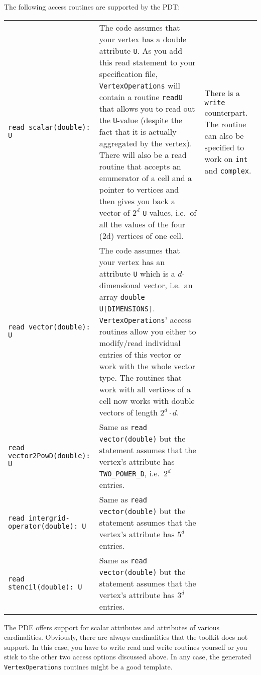 \noindent
The following access routines are supported by the PDT:

\begin{center}
\begin{tabular}{p{4.6cm}p{7.2cm}p{1.8cm}}
 \texttt{read scalar(double): U}
   & 
   The code assumes that your vertex has a double attribute \texttt{U}. As you
   add this read statement to your specification file, \texttt{VertexOperations}
   will contain a routine \texttt{readU} that allows you to read out the
   \texttt{U}-value (despite the fact that it is actually aggregated by the
   vertex).
   There will also be a read routine that accepts an enumerator of a cell and a
   pointer to vertices and then gives you back a vector of $2^d$
   \texttt{U}-values, i.e.~of all the values of the four (2d) vertices of one
   cell.
   &
   There is a \texttt{write} counterpart.
   The routine can also be specified to work on \texttt{int} and
   \texttt{complex}. \\
 \texttt{read vector(double): U}
   & 
   The code assumes that your vertex has an attribute \texttt{U} which is a
   $d$-dimensional vector, i.e.~an array \texttt{double U[DIMENSIONS]}.
   \texttt{VertexOperations}' access routines allow you either to modify/read
   individual entries of this vector or work with the whole vector type. The
   routines that work with all vertices of a cell now works with double vectors
   of length $2^d \cdot d$.
   \\
 \texttt{read vector2PowD(double): U}
   & 
   Same as \texttt{read vector(double)} but the statement assumes that the
   vertex's attribute has \texttt{TWO\_POWER\_D}, i.e.~$2^d$ entries.
   \\
 \texttt{read intergrid-operator(double): U}
   & 
   Same as \texttt{read vector(double)} but the statement assumes that the
   vertex's attribute has $5^d$ entries.
   \\
 \texttt{read stencil(double): U}
   & 
   Same as \texttt{read vector(double)} but the statement assumes that the
   vertex's attribute has $3^d$ entries.
\end{tabular}
\end{center}

\noindent
The PDE offers support for scalar attributes and attributes of various
cardinalities.
Obviously, there are always cardinalities that the toolkit does not support.
In this case, you have to write read and write routines yourself or you stick to
the other two access options discussed above.
In any case, the generated \texttt{VertexOperations} routines might be a good
template.



